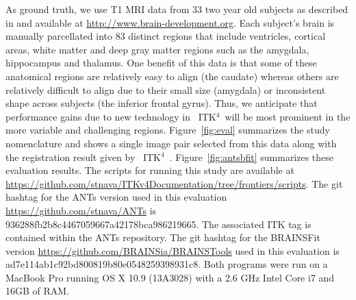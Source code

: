 \documentclass{frontiersSCNS}
\newcommand{\tk}{~ITK$^{\text{4}}$~}
\begin{document}
As ground truth, we use T1 MRI data from 33 two year old subjects as
described in \cite{Gousias2008} and available at
\href{http://www.brain-development.org}{http://www.brain-development.org}.
Each subject's brain is manually parcellated into 83 distinct regions
that include ventricles, cortical areas, white matter and deep gray
matter regions such as the amygdala, hippocampus and thalamus.  One
benefit of this data is that some of these anatomical regions are
relatively easy to align (the caudate) whereas others are relatively
difficult to align due to their small size (amygdala) or inconsistent
shape across subjects (the inferior frontal gyrus).  Thus, we
anticipate that performance gains due to new technology in \tk will be
most prominent in the more variable and challenging regions.
Figure~\ref{fig:eval} summarizes the study nomenclature and shows a single image pair selected from this
data along with the registration result given by \tk.
Figure~\ref{fig:antsbfit} summarizes these evaluation results.  
The scripts for running this study are available at
\href{https://github.com/stnava/ITKv4Documentation/tree/frontiers/scripts}{https://github.com/stnava/ITKv4Documentation/tree/frontiers/scripts}.
The git hashtag for the ANTs version used in this evaluation \href{https://github.com/stnava/ANTs}{https://github.com/stnava/ANTs}
is
936288fb2b8c4467059667a42178bca986219665.  The associated ITK tag is contained
within the ANTs repository.  
The git hashtag for the BRAINSFit version \href{https://github.com/BRAINSia/BRAINSTools}{https://github.com/BRAINSia/BRAINSTools} used in this evaluation is
ad7e114ab1c92bd800819b80e0548259398931c8.  Both programs were run on a
MacBook Pro running OS X 10.9 (13A3028) with a 2.6 GHz Intel Core i7 and 16GB of RAM.
\end{document}
